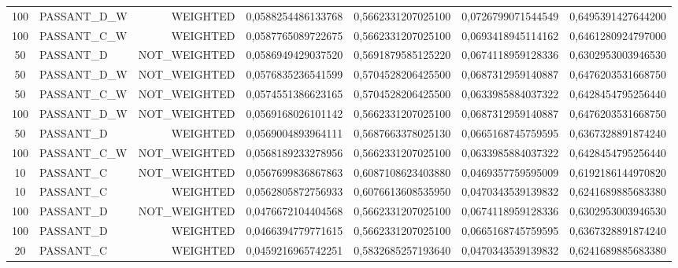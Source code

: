 \begin{table}[H]
{\begin{tabular}{ c l r c c c c }
				100 & PASSANT\_D\_W &   WEIGHTED & 0,0588254486133768 & 0,5662331207025100 & 0,0726799071544549 & 0,6495391427644200 \\
				
				100 & PASSANT\_C\_W &   WEIGHTED & 0,0587765089722675 & 0,5662331207025100 & 0,0693418945114162 & 0,6461280924797000 \\
				
				50 &  PASSANT\_D & NOT\_WEIGHTED & 0,0586949429037520 & 0,5691879585125220 & 0,0674118959128336 & 0,6302953003946530 \\
				
				50 & PASSANT\_D\_W & NOT\_WEIGHTED & 0,0576835236541599 & 0,5704528206425500 & 0,0687312959140887 & 0,6476203531668750 \\
				
				50 & PASSANT\_C\_W & NOT\_WEIGHTED & 0,0574551386623165 & 0,5704528206425500 & 0,0633985884037322 & 0,6428454795256440 \\
				
				100 & PASSANT\_D\_W & NOT\_WEIGHTED & 0,0569168026101142 & 0,5662331207025100 & 0,0687312959140887 & 0,6476203531668750 \\
				
				50 &  PASSANT\_D &   WEIGHTED & 0,0569004893964111 & 0,5687663378025130 & 0,0665168745759595 & 0,6367328891874240 \\
				
				100 & PASSANT\_C\_W & NOT\_WEIGHTED & 0,0568189233278956 & 0,5662331207025100 & 0,0633985884037322 & 0,6428454795256440 \\
				
				10 &  PASSANT\_C & NOT\_WEIGHTED & 0,0567699836867863 & 0,6087108623403880 & 0,0469357759595009 & 0,6192186144970820 \\
				
				10 &  PASSANT\_C &   WEIGHTED & 0,0562805872756933 & 0,6076613608535950 & 0,0470343539139832 & 0,6241689885683380 \\
				
				100 &  PASSANT\_D & NOT\_WEIGHTED & 0,0476672104404568 & 0,5662331207025100 & 0,0674118959128336 & 0,6302953003946530 \\
				
				100 &  PASSANT\_D &   WEIGHTED & 0,0466394779771615 & 0,5662331207025100 & 0,0665168745759595 & 0,6367328891874240 \\
				
				20 &  PASSANT\_C &   WEIGHTED & 0,0459216965742251 & 0,5832685257193640 & 0,0470343539139832 & 0,6241689885683380 \\
				

\end{tabular}}
\end{table}
